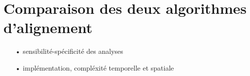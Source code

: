 \section{Comparaison des deux algorithmes d'alignement}

	\begin{itemize}
		\item[•] sensibilité-spécificité des analyses
		\item[•] implémentation, compléxité temporelle et spatiale
	\end{itemize}